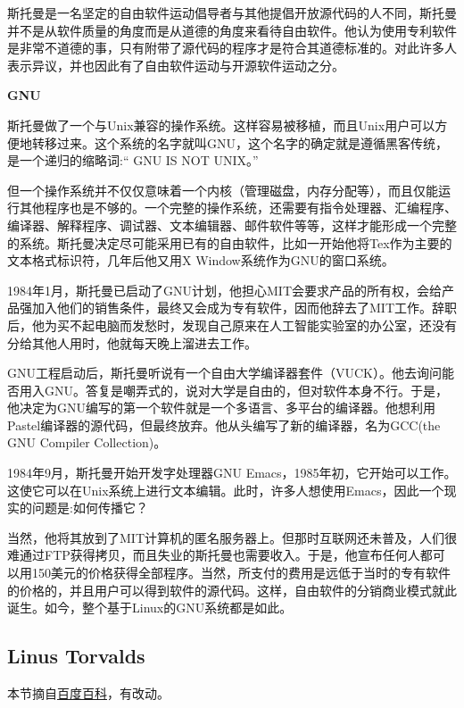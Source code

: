 \documentclass[doctor,openright,twoside]{sjtuthesis}
\theoremstyle{plain}
\theoremstyle{definition}
\theoremstyle{remark}
\theoremstyle{ocrenumbox}
\theoremstyle{plain}
\begin{document}
斯托曼是一名坚定的自由软件运动倡导者与其他提倡开放源代码的人不同，斯托曼并不是从软件质量的角度而是从道德的角度来看待自由软件。他认为使用专利软件是非常不道德的事，只有附带了源代码的程序才是符合其道德标准的。对此许多人表示异议，并也因此有了自由软件运动与开源软件运动之分。

\textbf{GNU}

斯托曼做了一个与Unix兼容的操作系统。这样容易被移植，而且Unix用户可以方便地转移过来。这个系统的名字就叫GNU，这个名字的确定就是遵循黑客传统，是一个递归的缩略词:`` GNU IS NOT UNIX。''

但一个操作系统并不仅仅意味着一个内核（管理磁盘，内存分配等），而且仅能运行其他程序也是不够的。一个完整的操作系统，还需要有指令处理器、汇编程序、编译器、解释程序、调试器、文本编辑器、邮件软件等等，这样才能形成一个完整的系统。斯托曼决定尽可能采用已有的自由软件，比如一开始他将Tex作为主要的文本格式标识符，几年后他又用X Window系统作为GNU的窗口系统。

1984年1月，斯托曼已启动了GNU计划，他担心MIT会要求产品的所有权，会给产品强加入他们的销售条件，最终又会成为专有软件，因而他辞去了MIT工作。辞职后，他为买不起电脑而发愁时，发现自己原来在人工智能实验室的办公室，还没有分给其他人用时，他就每天晚上溜进去工作。

GNU工程启动后，斯托曼听说有一个自由大学编译器套件（VUCK）。他去询问能否用入GNU。答复是嘲弄式的，说对大学是自由的，但对软件本身不行。于是，他决定为GNU编写的第一个软件就是一个多语言、多平台的编译器。他想利用Pastel编译器的源代码，但最终放弃。他从头编写了新的编译器，名为GCC(the GNU Compiler Collection)。

1984年9月，斯托曼开始开发字处理器GNU Emacs，1985年初，它开始可以工作。这使它可以在Unix系统上进行文本编辑。此时，许多人想使用Emacs，因此一个现实的问题是:如何传播它？

当然，他将其放到了MIT计算机的匿名服务器上。但那时互联网还未普及，人们很难通过FTP获得拷贝，而且失业的斯托曼也需要收入。于是，他宣布任何人都可以用150美元的价格获得全部程序。当然，所支付的费用是远低于当时的专有软件的价格的，并且用户可以得到软件的源代码。这样，自由软件的分销商业模式就此诞生。如今，整个基于Linux的GNU系统都是如此。

\hypertarget{linus-torvalds}{%
\subsection{Linus Torvalds}\label{linus-torvalds}}

本节摘自\href{https://baike.baidu.com/item/\%E6\%9E\%97\%E7\%BA\%B3\%E6\%96\%AF\%C2\%B7\%E6\%89\%98\%E7\%93\%A6\%E5\%85\%B9/2122821?fr=aladdin\&fromid=400810\&fromtitle=linus}{百度百科}，有改动。
\end{document}
